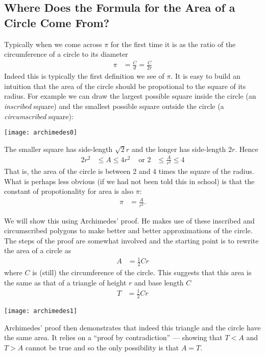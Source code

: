 \subsection{Where Does the Formula for the Area of a Circle Come From?}
Typically when we come across $\pi$ for the first time it is as the ratio of the
circumference of a circle to its diameter
\begin{align*}
  \pi &= \frac{C}{d} = \frac{C}{2r}
\end{align*}
Indeed this is typically the first definition we see of $\pi$.  It is easy to build an intuition that the area of the circle should be propotional to the square of its radius. For example we can draw the largest possible square inside the circle (an \emph{inscribed} square) and the smallest possible square outside the circle (a \emph{circumscribed} square):
\begin{center}
 \texttt{[image: archimedes0]}
\end{center}
The smaller square has side-length $\sqrt{2} r$ and the longer has side-length $2r$. Hence
\begin{align*}
  2 r^2 & \leq A \leq 4r^2 & \text{ or }  2 & \leq \frac{A}{r^2} \leq 4
\end{align*}
That is, the area of the circle is between 2 and 4 times the square of the radius. What is perhaps less obvious (if we had not been told this in school) is that the constant of propotionality for area is also $\pi$:
\begin{align*}
  \pi &= \frac{A}{r^2}.
\end{align*}


We will show this using Archimedes' proof. He makes use of these inscribed and circumscribed polygons to make better and better approximations of the circle. The steps of the proof are somewhat involved and the starting point is to rewrite the area of a circle as
\begin{align*}
  A &= \frac{1}{2} C r
\end{align*}
where $C$ is (still) the circumference of the circle. This suggests that this
area is the same as that of a triangle of height $r$ and base
length $C$
\begin{align*}
  T &= \frac{1}{2} C r
\end{align*}
\begin{center}
 \texttt{[image: archimedes1]}
\end{center}
Archimedes' proof then demonstrates that indeed this triangle and the circle have the same
area. It relies on a ``proof by contradiction'' --- showing that $T<A$ and $T>A$ cannot
be true and so the only possibility is that $A=T$.

